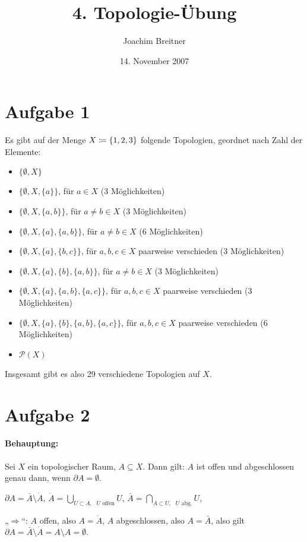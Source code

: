 \documentclass{article}
\title{4. Topologie-Übung}
\author{Joachim Breitner}
\date{14. November 2007}
\begin{document}
\maketitle
\section*{Aufgabe 1}

Es gibt auf der Menge $X \mathrel{\mbox{$\coloneqq$}} \{1,2,3\}$ folgende Topologien, geordnet nach Zahl der Elemente:
\begin{itemize}
\item $\{\emptyset, X\}$
\item $\{\emptyset, X, \{a\}\}$, für $a\in X$ (3 Möglichkeiten)
\item $\{\emptyset, X, \{a,b\}\}$, für $a\ne b\in X$ (3 Möglichkeiten)
\item $\{\emptyset, X, \{a\}, \{a,b\}\}$, für $a\ne b\in X$ (6 Möglichkeiten)
\item $\{\emptyset, X, \{a\}, \{b,c\}\}$, für $a,b,c\in X$ paarweise verschieden (3 Möglichkeiten)
\item $\{\emptyset, X, \{a\}, \{b\}, \{a,b\}\}$, für $a\ne b\in X$ (3 Möglichkeiten)
\item $\{\emptyset, X, \{a\}, \{a,b\}, \{a,c\}\}$, für $a,b,c\in X$ paarweise verschieden (3 Möglichkeiten)
\item $\{\emptyset, X, \{a\}, \{b\}, \{a,b\}, \{a,c\}\}$, für $a,b,c\in X$ paarweise verschieden (6 Möglichkeiten)
\item $\mathcal P(X)$
\end{itemize}
Insgesamt gibt es also 29 verschiedene Topologien auf $X$.

\section*{Aufgabe 2}

\paragraph{Behauptung:} Sei $X$ ein topologischer Raum, $A\subseteq X$. Dann gilt: $A$ ist offen und abgeschlossen genau dann, wenn $\partial A=\emptyset$.

$\partial A = \bar A \setminus \mathring A$, $\mathring A = \bigcup_{U\subset A,\text{ $U$ offen}} U$, $\bar A = \bigcap_{A\subset U,\text{ $U$ abg.}} U$, 

„$\Longrightarrow$“: $A$ offen, also $A = \mathring A$, $A$ abgeschlossen, also $A= \bar A$, also gilt $\partial A = \bar A \setminus \mathring A = A \setminus A = \emptyset$.
\end{document}
